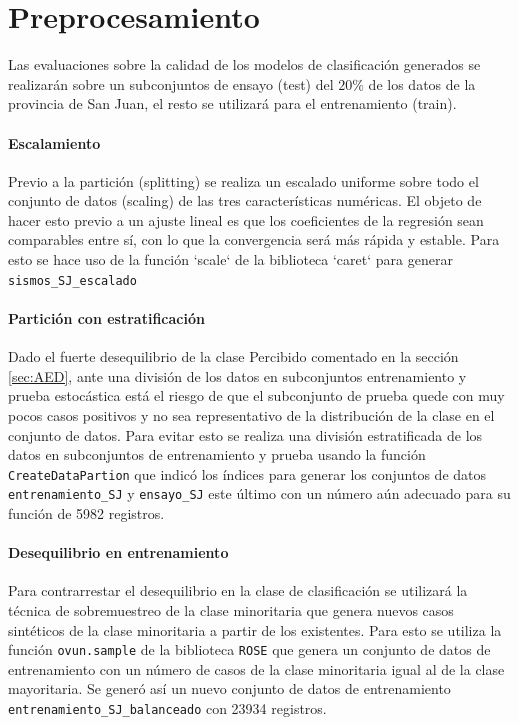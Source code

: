 \documentclass[a4paper]{report}
\begin{document}
\section{Preprocesamiento}


Las evaluaciones sobre la calidad de los modelos de clasificación generados se realizarán sobre un subconjuntos de ensayo (test) del \(20 \%\) de los datos de la provincia de San Juan, el resto se utilizará para el entrenamiento (train).

\paragraph{Escalamiento}
Previo a la partición (splitting) se realiza un escalado uniforme sobre todo el conjunto de datos (scaling) de las tres características numéricas. 
El objeto de hacer esto previo a un ajuste lineal es que los coeficientes de la regresión sean comparables entre sí, con lo que la convergencia será más rápida y estable.
Para esto se hace uso de la función `scale` de la biblioteca `caret` para generar \verb'sismos_SJ_escalado' 


\paragraph{Partición con estratificación}
Dado el fuerte desequilibrio de la clase Percibido comentado en la sección \ref{sec:AED}, ante una división de los datos en subconjuntos entrenamiento y prueba estocástica está el riesgo de que el subconjunto de prueba quede con muy pocos casos positivos y no sea representativo de la distribución de la clase en el conjunto de datos. 
Para evitar esto se realiza una división estratificada de los datos en subconjuntos de entrenamiento y prueba usando la función \verb'CreateDataPartion' que indicó los índices para generar los conjuntos de datos \verb'entrenamiento_SJ' y \verb'ensayo_SJ' este último con un número aún adecuado para su función de \num{5982} registros.


\paragraph{Desequilibrio en entrenamiento}
Para contrarrestar el desequilibrio en la clase de clasificación se utilizará la técnica de sobremuestreo de la clase minoritaria que genera nuevos casos sintéticos de la clase minoritaria a partir de los existentes.
Para esto se utiliza la función \verb'ovun.sample' de la biblioteca \verb'ROSE' que genera un conjunto de datos de entrenamiento con un número de casos de la clase minoritaria igual al de la clase mayoritaria.
Se generó así un nuevo conjunto de datos de entrenamiento \verb'entrenamiento_SJ_balanceado' con \num{23934} registros.
\end{document}
